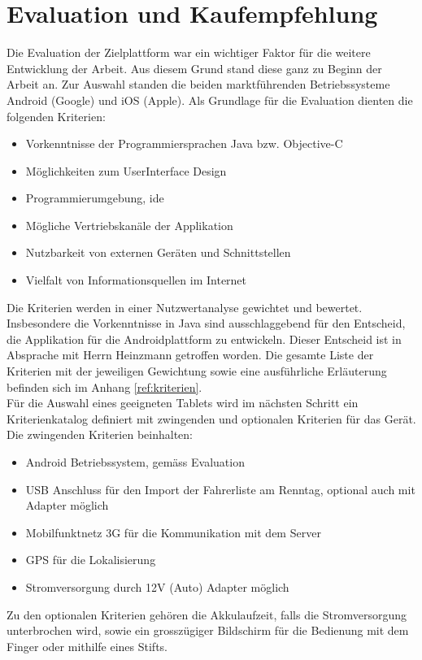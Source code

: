 \section{Evaluation und Kaufempfehlung}
\label{kap:kaufempfehlung}
Die Evaluation der Zielplattform war ein wichtiger Faktor für die weitere Entwicklung der Arbeit. Aus diesem Grund stand diese ganz zu Beginn der Arbeit an. Zur Auswahl standen die beiden marktführenden Betriebssysteme Android (Google) und iOS (Apple). Als Grundlage für die Evaluation dienten die folgenden Kriterien:
\begin{itemize}
\item Vorkenntnisse der Programmiersprachen Java bzw. Objective-C
\item Möglichkeiten zum UserInterface Design
\item Programmierumgebung, \gls{ide}
\item Mögliche Vertriebskanäle der Applikation
\item Nutzbarkeit von externen Geräten und Schnittstellen
\item Vielfalt von Informationsquellen im Internet
\end{itemize}
Die Kriterien werden in einer Nutzwertanalyse gewichtet und bewertet. Insbesondere die Vorkenntnisse in Java sind  ausschlaggebend für den Entscheid, die Applikation für die Androidplattform zu entwickeln. Dieser Entscheid ist in Absprache mit Herrn Heinzmann getroffen worden. Die gesamte Liste der Kriterien mit der jeweiligen Gewichtung sowie eine ausführliche Erläuterung befinden sich im Anhang \ref{ref:kriterien}.
\\

Für die Auswahl eines geeigneten Tablets wird im nächsten Schritt ein Kriterienkatalog definiert mit zwingenden und optionalen Kriterien für das Gerät. Die zwingenden Kriterien beinhalten:
\begin{itemize}
\item Android Betriebssystem, gemäss Evaluation
\item USB Anschluss für den Import der Fahrerliste am Renntag, optional auch mit Adapter möglich
\item Mobilfunktnetz 3G für die Kommunikation mit dem Server
\item GPS für die Lokalisierung
\item Stromversorgung durch 12V (Auto) Adapter möglich
\end{itemize}
Zu den optionalen Kriterien gehören die Akkulaufzeit, falls die Stromversorgung unterbrochen wird, sowie ein grosszügiger Bildschirm für die Bedienung mit dem Finger oder mithilfe eines Stifts.
\\

